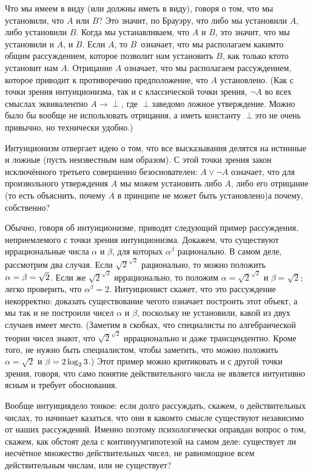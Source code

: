 Что мы имеем в виду (или должны иметь в виду), говоря о том, что
мы установили, что  $A$ или $B$? Это значит, по Брауэру,
что либо мы установили $A$, либо установили $B$. Когда мы
устанавливаем, что $A$ и $B$, это значит, что мы
установили и $A$, и $B$.  Если $A$, то $B$\ означает, что
мы располагаем каким\д то общим рассуждением, которое позволит
нам установить $B$, как только кто\д то установит нам $A$.
Отрицание $A$ означает, что мы располагаем рассуждением, которое
приводит к противоречию предположение, что $A$ установлено. (Как
с точки зрения интуиционизма, так и с классической точки зрения,
$\lnot A$ во всех смыслах эквивалентно $A\to\perp$, где
$\perp$\т заведомо ложное утверждение. Можно было бы вообще не
использовать отрицания, а иметь константу $\perp$\т это не очень
привычно, но технически удобно.)

Интуиционизм отвергает идею о том, что все высказывания делятся
на истинные и ложные (пусть неизвестным нам образом). С этой
точки зрения закон исключённого третьего совершенно
безоснователен: $A\lor \lnot A$ означает, что для произвольного
утверждения $A$ мы можем установить либо $A$, либо его отрицание
(то есть объяснить, почему $A$ в принципе не может быть
установлено)\т а почему, собственно?

Обычно, говоря об интуиционизме, приводят следующий пример
рассуждения, неприемлемого с точки зрения интуиционизма.
Докажем, что существуют иррациональные числа $\alpha$ и $\beta$,
для которых $\alpha^\beta$ рационально. В самом деле, рассмотрим
два случая. Если $\sqrt{2}^{\sqrt{2}}$ рационально, то можно
положить $\alpha\hm=\beta\hm=\sqrt{2}$. Если же
$\sqrt{2}^{\sqrt{2}}$ иррационально, то положим
$\alpha=\sqrt{2}^{\sqrt{2}}$ и $\beta=\sqrt{2}$; легко
проверить, что $\alpha^{\beta}=2$. Интуиционист скажет, что это
рассуждение некорректно: доказать существование чего\д то
означает построить этот объект, а мы так и не построили чисел
$\alpha$ и $\beta$, поскольку
не установили, какой из двух случаев
имеет место. (Заметим в скобках, что специалисты по
алгебраической теории чисел знают, что $\sqrt{2}^{\sqrt{2}}$
иррационально и даже трансцендентно. Кроме того, не нужно быть
специалистом, чтобы заметить, что можно положить
$\alpha=\sqrt{2}$ и $\beta\hm=2\log_2 3$.) Этот пример можно
критиковать и с другой точки зрения, говоря, что само понятие
действительного числа не является интуитивно ясным и требует
обоснования.

Вообще интуиция\т дело тонкое: если долго рассуждать, скажем,
о действительных числах, то начинает казаться, что они в каком\д то
смысле существуют независимо от наших рассуждений. Именно поэтому
психологически оправдан вопрос о том, скажем, как обстоят дела
с континуум\д гипотезой  на самом деле: существует
ли несчётное множество действительных чисел, не равномощное
всем действительным числам, или не су\-щест\-вует?


